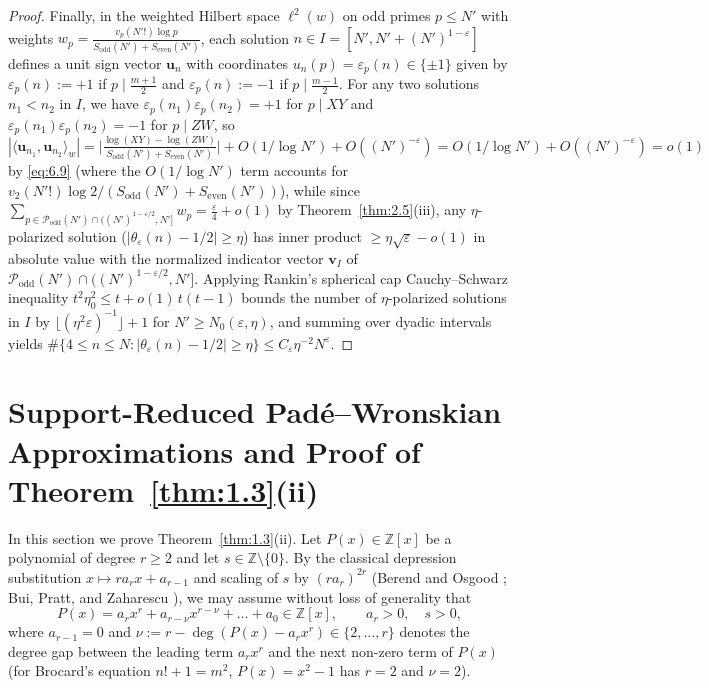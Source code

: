 \documentclass[11pt,reqno]{amsart}
\theoremstyle{remark}
\numberwithin{equation}{section}
\newcommand{\Z}{\mathbb{Z}}
\newcommand{\Podd}{\mathcal{P}_{\mathrm{odd}}}
\newcommand{\Sodd}{S_{\mathrm{odd}}}
\newcommand{\Seven}{S_{\mathrm{even}}}
\begin{document}
\begin{proof}
Finally, in the weighted Hilbert space $\ell^2(w)$ on odd primes $p \le N'$ with weights $w_p = \frac{v_p(N'!)\log p}{\Sodd(N') + \Seven(N')}$, each solution $n \in I = [N', N' + (N')^{1-\varepsilon}]$ defines a unit sign vector $\mathbf{u}_n$ with coordinates $u_n(p) = \varepsilon_p(n) \in \{\pm 1\}$ given by $\varepsilon_p(n) := +1$ if $p \mid \frac{m+1}{2}$ and $\varepsilon_p(n) := -1$ if $p \mid \frac{m-1}{2}$. For any two solutions $n_1 < n_2$ in $I$, we have $\varepsilon_p(n_1)\varepsilon_p(n_2) = +1$ for $p \mid XY$ and $\varepsilon_p(n_1)\varepsilon_p(n_2) = -1$ for $p \mid ZW$, so $|\langle \mathbf{u}_{n_1}, \mathbf{u}_{n_2} \rangle_w| = \bigl|\frac{\log(XY) - \log(ZW)}{\Sodd(N') + \Seven(N')}\bigr| + O(1/\log N') + O((N')^{-\varepsilon}) = O(1/\log N') + O((N')^{-\varepsilon}) = o(1)$ by \eqref{eq:6.9} (where the $O(1/\log N')$ term accounts for $v_2(N'!)\log 2 / (\Sodd(N') + \Seven(N'))$), while since $\sum_{p \in \Podd(N') \cap ((N')^{1-\varepsilon/2}, N']} w_p = \frac{\varepsilon}{4} + o(1)$ by Theorem~\ref{thm:2.5}(iii), any $\eta$-polarized solution ($|\theta_\varepsilon(n) - 1/2| \ge \eta$) has inner product $\ge \eta\sqrt{\varepsilon} - o(1)$ in absolute value with the normalized indicator vector $\mathbf{v}_I$ of $\Podd(N') \cap ((N')^{1-\varepsilon/2}, N']$. Applying Rankin's spherical cap Cauchy--Schwarz inequality $t^2\eta_0^2 \le t + o(1)\,t(t - 1)$ bounds the number of $\eta$-polarized solutions in $I$ by $\lfloor (\eta^2\varepsilon)^{-1} \rfloor + 1$ for $N' \ge N_0(\varepsilon, \eta)$, and summing over dyadic intervals yields $\#\{4 \le n \le N : |\theta_\varepsilon(n) - 1/2| \ge \eta\} \le C_\varepsilon \eta^{-2} N^\varepsilon$.
\end{proof}

\section{Support-Reduced Pad\'e--Wronskian Approximations and Proof of Theorem~\ref{thm:1.3}(ii)}\label{sec:7}

In this section we prove Theorem~\ref{thm:1.3}(ii). Let $P(x) \in \Z[x]$ be a polynomial of degree $r \ge 2$ and let $s \in \Z \setminus \{0\}$. By the classical depression substitution $x \mapsto r a_r x + a_{r-1}$ and scaling of $s$ by $(r a_r)^{2r}$ (Berend and Osgood \cite[Lemma~1]{BerendOsgood1992}; Bui, Pratt, and Zaharescu \cite[Section~3]{BuiPrattZaharescu2023}), we may assume without loss of generality that
\begin{equation}\label{eq:7.1}
P(x) = a_r x^r + a_{r-\nu} x^{r-\nu} + \dots + a_0 \in \Z[x], \qquad a_r > 0, \quad s > 0,
\end{equation}
where $a_{r-1} = 0$ and $\nu := r - \deg(P(x) - a_r x^r) \in \{2, \dots, r\}$ denotes the degree gap between the leading term $a_r x^r$ and the next non-zero term of $P(x)$ (for Brocard's equation $n! + 1 = m^2$, $P(x) = x^2 - 1$ has $r = 2$ and $\nu = 2$).
\end{document}

